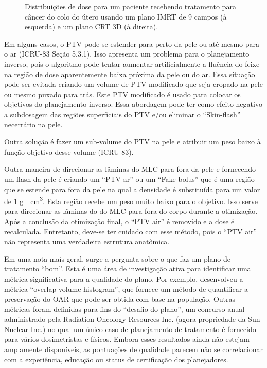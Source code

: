 \documentclass[11pt,a4paper]{article}
\newcounter{exemplo}
\begin{document}
	\begin{figure}[h]
		\centering
		\caption{Distribuições de dose para um paciente recebendo tratamento para câncer do colo do útero usando um plano IMRT de 9 campos (à esquerda) e um plano CRT 3D (à direita).}
		\label{fig:imrt9campos}
	\end{figure}

	Em alguns casos, o PTV pode se estender para perto da pele ou até mesmo para o ar (ICRU-83 Seção 5.3.1). Isso apresenta um problema para o planejamento inverso, pois o algoritmo pode tentar aumentar artificialmente a fluência do feixe na região de dose aparentemente baixa próxima da pele ou do ar.  Essa situação pode ser evitada criando um volume de PTV modificado que seja cropado na pele ou mesmo puxado para trás. Este PTV modificado é usado para colocar os objetivos do planejamento inverso. Essa abordagem pode ter como  efeito negativo a subdosagem das regiões superficiais do PTV e/ou eliminar o “Skin-flash” necerrário na pele.

	Outra solução é fazer um sub-volume do PTV na pele e atribuir um peso baixo à função objetivo desse volume (ICRU-83). 

	Outra maneira de direcionar as lâminas do MLC para fora da pele e fornecendo um flash da pele é criando um ``PTV ar'' ou um  ``Fake bolus'' que é uma região que se estende para fora da pele na qual a densidade é substituída para um valor de 1 \unit{g \cdot cm^3}. Esta região recebe um peso muito baixo para o objetivo. Isso serve para direcionar as lâminas do  do MLC para fora do corpo durante a otimização. Após a conclusão da otimização final, o “PTV air” é removido e a dose é recalculada. Entretanto, deve-se ter cuidado com esse método, pois o “PTV air” não representa uma verdadeira estrutura anatômica.


	Em uma nota mais geral, surge a pergunta sobre o que faz um plano de tratamento “bom”. Esta é uma área de investigação ativa para identificar uma métrica significativa para a qualidade do plano. Por exemplo, \citet{WU20111241} desenvolveu a métrica “overlap volume histogram”, que fornece um método de quantificar a preservação do OAR que pode ser obtida com base na população. Outras métricas foram definidas para fins do “desafio do plano”, um concurso anual administrado pela Radiation Oncology Resources Inc. (agora propriedade da Sun Nuclear Inc.) no qual um único caso de planejamento de tratamento é fornecido para vários dosimetristas e físicos. Embora esses resultados ainda não estejam amplamente disponíveis, as pontuações de qualidade parecem não se correlacionar com a experiência, educação ou status de certificação dos planejadores.
\end{document}
